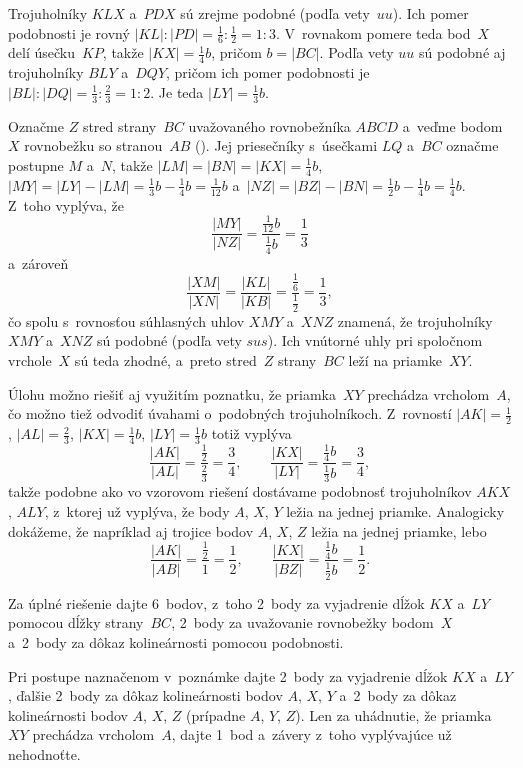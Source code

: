 {%
Trojuholníky $KLX$ a~$PDX$ sú zrejme podobné (podľa vety~$uu$).
Ich pomer podobnosti je rovný
$|KL|:|PD|=\frac16:\frac12=1:3$. V~rovnakom pomere teda bod~$X$ delí
úsečku~$KP$, takže $|KX|=\frac14 b$, pričom $b=|BC|$. Podľa vety $uu$ sú podobné
aj trojuholníky $BLY$ a~$DQY$, pričom ich pomer podobnosti je
$|BL|:|DQ|=\frac13:\frac23={1:2}$. Je teda $|LY|=\frac13b$.

Označme $Z$ stred strany~$BC$ uvažovaného rovnobežníka $ABCD$
a~veďme bodom~$X$ rovnobežku so stranou~$AB$ (\obr).
Jej priesečníky s~úsečkami $LQ$ a~$BC$ označme postupne $M$ a~$N$,
takže $|LM|=|BN|=|KX|=\frac14 b$,
$|MY|=|LY|-|LM|={\frac13b-\frac14 b}=\frac1{12} b$
a~$|NZ|=|BZ|-|BN|=\frac12b-\frac14 b=\frac14 b$.
Z~toho vyplýva, že
$$
\frac{|MY|}{|NZ|}=\frac{\frac1{12} b}{\frac14 b}=\frac13
$$
a~zároveň
$$
\frac{|XM|}{|XN|}=\frac{|KL|}{|KB|}=
\frac{\frac16}{\frac12}=\frac13,
$$
čo spolu s~rovnosťou súhlasných uhlov $XMY$ a~$XNZ$ znamená, že
trojuholníky $XMY$ a~$XNZ$ sú podobné (podľa vety $sus$).
Ich vnútorné uhly pri spoločnom vrchole~$X$ sú teda zhodné,
a~preto stred~$Z$ strany~$BC$ leží na priamke~$XY$.
%

\poznamka
Úlohu možno riešiť aj využitím poznatku, že priamka~$XY$ prechádza vrcholom~$A$,
čo možno tiež odvodiť úvahami o~podobných trojuholníkoch.
Z~rovností $|AK|=\frac12$, $|AL|=\frac23$, $|KX|=\frac14b$, $|LY|=\frac13b$ totiž vyplýva
$$
\frac{|AK|}{|AL|} = \frac{\frac12} {\frac23} = \frac34, \qquad
\frac{|KX|}{|LY|} = \frac{\frac14b}{\frac13b} =\frac 34,
$$
takže podobne ako vo vzorovom riešení dostávame podobnosť
trojuholníkov $AKX$, $ALY$, z~ktorej už vyplýva, že body $A$, $X$, $Y$ ležia na jednej priamke.
Analogicky dokážeme, že napríklad aj trojice bodov $A$, $X$, $Z$ ležia
na jednej priamke, lebo
$$
\frac{|AK|}{|AB|} = \frac{\frac12} {1} = \frac12, \qquad
\frac{|KX|}{|BZ|} = \frac{\frac14b}{\frac12b} =\frac 12.
$$

\nobreak\medskip\petit\noindent
Za úplné riešenie dajte 6~bodov, z~toho 2~body
za vyjadrenie dĺžok $KX$ a~$LY$ pomocou dĺžky strany~$BC$,
2~body za uvažovanie rovnobežky bodom~$X$ a~2~body za dôkaz
kolineárnosti pomocou podobnosti.

Pri postupe naznačenom v~poznámke dajte 2~body za vyjadrenie
dĺžok $KX$ a~$LY$, ďalšie
2~body za dôkaz kolineárnosti bodov $A$, $X$, $Y$
a~2~body za dôkaz kolineárnosti bodov $A$, $X$, $Z$ (prípadne $A$, $Y$, $Z$).
Len za uhádnutie, že priamka~$XY$ prechádza vrcholom~$A$,
dajte 1~bod a~závery z~toho vyplývajúce už nehodnoťte.
\endpetit
\bigbreak
}


